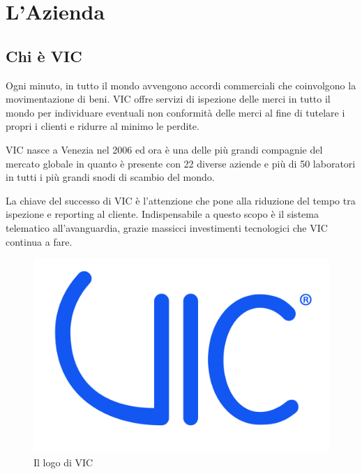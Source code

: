 
\chapter{L'Azienda}
\label{cap:azienda}


\section{Chi è VIC}
	Ogni minuto, in tutto il mondo avvengono accordi commerciali che coinvolgono la
	movimentazione di beni. VIC offre servizi di ispezione delle merci in 
	tutto il mondo per individuare eventuali non conformità delle merci 
	al fine di tutelare i propri i clienti e ridurre al minimo le perdite.
	
	VIC nasce a Venezia nel 2006 ed ora è una delle più grandi compagnie del mercato globale in quanto 
	è presente con 22 diverse aziende e più di 50 laboratori in tutti i più grandi snodi di scambio del mondo.
	
	La chiave del successo di VIC è l'attenzione che pone alla riduzione del tempo tra ispezione e reporting al cliente. 
	Indispensabile a questo scopo è il sistema telematico all'avanguardia, grazie massicci investimenti tecnologici che VIC continua a fare.
	
	
	\begin{figure}[ht]
		\centering
		\includegraphics[width=0.5\linewidth]{immagini/logo-vic}
		\caption{Il logo di VIC}
		\label{fig:logo-vic}
	\end{figure}


